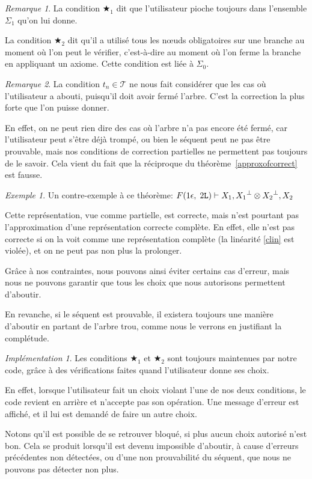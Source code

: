\documentclass[11pt,a4paper]{article}
\theoremstyle{plain}
\theoremstyle{definition}
\theoremstyle{remark}
\newtheorem{remark}{Remarque}
\newtheorem{example}{Exemple}
\newtheorem{implementation}{Implémentation}
\newcommand*{\orth}{^\perp}
\newcommand*{\tensor}{\otimes}
\newcommand*{\Left}{\textnormal{\texttt{L}}}
\newcommand*{\trees}{\ensuremath{\mathcal{T}}}
\newcommand*{\lowapprox}{\ensuremath{\Sigma_0}}
\newcommand*{\highapprox}{\ensuremath{\Sigma_1}}
\newcommand*{\exactcond}{\bigstar_1}
\newcommand*{\exactcondbis}{\bigstar_2}
\begin{document}
\begin{remark}
    La condition $\exactcond$ dit que l'utilisateur pioche toujours dans l'ensemble $\highapprox$ qu'on lui donne.
    
    La condition $\exactcondbis$ dit qu'il a utilisé tous les n\oe uds obligatoires sur une branche au moment où l'on peut le vérifier, c'est-à-dire au moment où l'on ferme la branche en appliquant un axiome. Cette condition est liée à $\lowapprox$.
\end{remark}

\begin{remark}
    \label{correction_desc}
    La condition $t_n \in \trees$ ne nous fait considérer que les cas où l'utilisateur a abouti, puisqu'il doit avoir fermé l'arbre. C'est la correction la plus forte que l'on puisse donner.
    
    En effet, on ne peut rien dire des cas où l'arbre n'a pas encore été fermé, car l'utilisateur peut s'être déjà trompé, ou bien le séquent peut ne pas être prouvable, mais nos conditions de correction partielles ne permettent pas toujours de le savoir. Cela vient du fait que la réciproque du théorème~\ref{approxofcorrect} est fausse.

    \begin{example}
        Un contre-exemple à ce théorème:
\quad
        $F(1 \epsilon, \; 2 \Left) \vdash X_1, {X_1}\orth \tensor {X_2}\orth, X_2$

        Cette représentation, vue comme partielle, est correcte, mais n'est pourtant pas l'approximation d'une représentation correcte complète. En effet, elle n'est pas correcte si on la voit comme une représentation complète (la linéarité \ref{clin} est violée), et on ne peut pas non plus la prolonger.
    \end{example}
    
    Grâce à nos contraintes, nous pouvons ainsi éviter certains cas d'erreur, mais nous ne pouvons garantir que tous les choix que nous autorisons permettent d'aboutir.  
    
    En revanche, si le séquent est prouvable, il existera toujours une manière d'aboutir en partant de l'arbre trou, comme nous le verrons en justifiant la complétude.
\end{remark}

\begin{implementation}
    Les conditions $\exactcond$ et $\exactcondbis$ sont toujours maintenues par notre code, grâce à des vérifications faites quand l'utilisateur donne ses choix.

    En effet, lorsque l'utilisateur fait un choix violant l'une de nos deux conditions, le code revient en arrière et n'accepte pas son opération. Une message d'erreur est affiché, et il lui est demandé de faire un autre choix. 
    
    Notons qu'il est possible de se retrouver bloqué, si plus aucun choix autorisé n'est bon. Cela se produit lorsqu'il est devenu impossible d'aboutir, à cause d'erreurs précédentes non détectées, ou d'une non prouvabilité du séquent, que nous ne pouvons pas détecter non plus.
\end{implementation}
\end{document}
